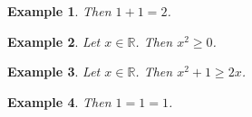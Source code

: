 \documentclass[12pt]{article}
\newtheorem{example}{Example}
\begin{document}
\begin{example}
    Then $1+1=2$.
\end{example}

\begin{example}
    Let $x\in\mathbb{R}$. Then $x^2\ge 0$.
\end{example}

\begin{example}
    Let $x\in\mathbb{R}$. Then $x^2 + 1\ge 2x$.
\end{example}

\begin{example}
    Then $1=1=1$.
\end{example}
\end{document}
